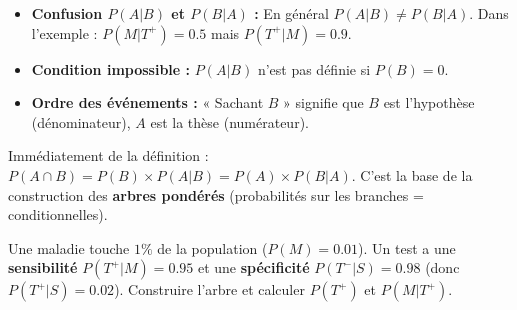 \documentclass[11pt]{article}
\begin{document}
\begin{attention}
\begin{itemize}
    \item \textbf{Confusion $P(A|B)$ et $P(B|A)$ :} En général $P(A|B) \neq P(B|A)$. Dans l'exemple : $P(M|T^+)=\num{0,5}$ mais $P(T^+|M)=\num{0,9}$.
    \item \textbf{Condition impossible :} $P(A|B)$ n'est pas définie si $P(B)=0$.
    \item \textbf{Ordre des événements :} « Sachant $B$ » signifie que $B$ est l'hypothèse (dénominateur), $A$ est la thèse (numérateur).
\end{itemize}
\end{attention}

\begin{propriete}
Immédiatement de la définition : $P(A \cap B) = P(B) \times P(A | B) = P(A) \times P(B | A)$.
C'est la base de la construction des \textbf{arbres pondérés} (probabilités sur les branches = conditionnelles).
\end{propriete}

\begin{exemplebox}
Une maladie touche $\num{1}\%$ de la population ($P(M)=\num{0,01}$). Un test a une \textbf{sensibilité} $P(T^+|M)=\num{0,95}$ et une \textbf{spécificité} $P(T^-|S)=\num{0,98}$ (donc $P(T^+|S)=\num{0,02}$).
Construire l'arbre et calculer $P(T^+)$ et $P(M|T^+)$.
\end{exemplebox}
\end{document}

